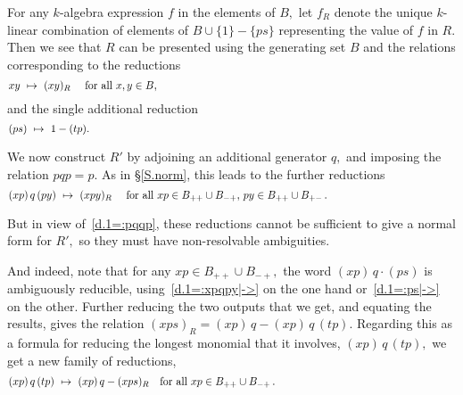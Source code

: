 \documentclass{amsart}
\begin{document}
For any $\!k\!$-algebra expression $f$ in the elements of $B,$
let $f_R$ denote the unique $\!k\!$-linear combination
of elements of $B\cup\{1\}-\{ps\}$ representing the value
of $f$ in $R.$
Then we see that $R$ can be presented using the generating set $B$
and the relations corresponding to the reductions
\begin{equation}\begin{minipage}[c]{35pc}\label{d.1=:xy|->}
$xy\ \mapsto\ (xy)_R$ \quad for all $x,y\in B,$
\end{minipage}\end{equation}
and the single additional reduction
\begin{equation}\begin{minipage}[c]{35pc}\label{d.1=:ps|->}
$(ps)\ \mapsto\ 1-(tp).$
\end{minipage}\end{equation}

We now construct $R'$ by adjoining an additional generator $q,$
and imposing the relation $pqp=p.$
As in \S\ref{S.norm}, this leads to the further reductions
\begin{equation}\begin{minipage}[c]{35pc}\label{d.1=:xpqpy|->}
$(xp)\,q\,(py)\ \mapsto\ (xpy)_R$ \quad for all
$xp\in B_{++}\cup B_{-+},$ $py\in B_{++}\cup B_{+-}\,.$
\end{minipage}\end{equation}

But in view of~\eqref{d.1=:pqqp}, these reductions
cannot be sufficient to give a normal form for $R',$ so they must have
non-resolvable ambiguities.

And indeed, note that
for any $xp\in B_{++}\cup B_{-+},$ the word $(xp)\,q\cdot(ps)$
is ambiguously reducible, using~\eqref{d.1=:xpqpy|->} on the
one hand or~\eqref{d.1=:ps|->} on the other.
Further reducing the two outputs that we get, and
equating the results, gives the
relation $(xps)_R = (xp)\,q-(xp)\,q\,(tp).$
Regarding this as a formula for reducing the
longest monomial that it involves, $(xp)\,q\,(tp),$
we get a new family of reductions,
\begin{equation}\begin{minipage}[c]{35pc}\label{d.1=:xpqtp|->}
$(xp)\,q\,(tp)\ \mapsto\ (xp)\,q-(xps)_R$\quad
for all $xp\in B_{++}\cup B_{-+}\,.$
\end{minipage}\end{equation}
\end{document}
